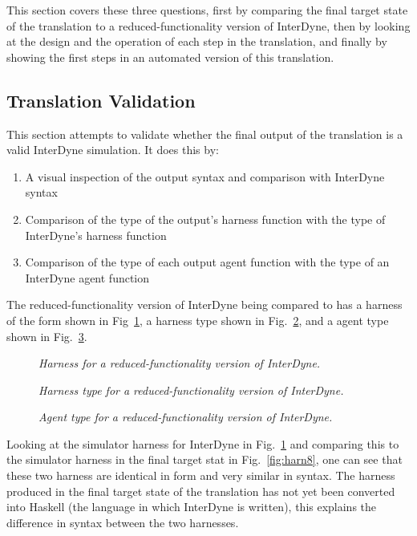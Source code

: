 \documentclass{article}
\begin{document}
This section covers these three questions, first by comparing the final target state of the translation to a reduced-functionality version of InterDyne, then by looking at the design and the operation of each step in the translation, and finally by showing the first steps in an automated version of this translation.  


\subsection{Translation Validation}
This section attempts to validate whether the final output of the translation is a valid InterDyne simulation. It does this by:
\begin{enumerate}
  \item A visual inspection of the output syntax and comparison with InterDyne syntax
  \item Comparison of the type of the output's harness function with the type of InterDyne's harness function
  \item Comparison of the type of each output agent function with the type of an InterDyne agent function
\end{enumerate}

The  reduced-functionality version of InterDyne being compared to has a harness of the form shown in Fig~\ref{fig:harntypinharnes}, a harness type shown in Fig.~\ref{fig:harntypint}, and a agent type shown in Fig.~\ref{fig:agentpint}.
\begin{figure}[H]
	\centering
	
	\caption{\it Harness for a reduced-functionality version of InterDyne.}
	\label{fig:harntypinharnes} 
\end{figure} 
\begin{figure}[H]
	\centering
	
	\caption{\it Harness type for a reduced-functionality version of InterDyne.}
	\label{fig:harntypint}
\end{figure} 
\begin{figure}[H]
	\centering
	
	\caption{\it Agent type for a reduced-functionality version of InterDyne.}
	\label{fig:agentpint}
\end{figure} 

Looking at the simulator harness for InterDyne in Fig.~\ref{fig:harntypinharnes} and comparing this to the simulator harness in the final target stat in Fig.~\ref{fig:harn8}, one can see that these two harness are identical in form and very similar in syntax. The harness produced in the final target state of the translation has not yet been converted into Haskell (the language in which InterDyne is written), this explains the difference in syntax between the two harnesses. 
\end{document}
